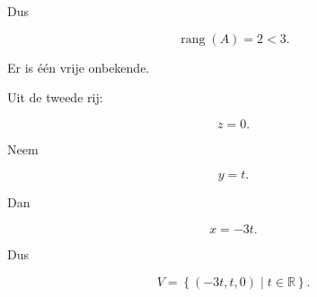 \documentclass{ximera}
\begin{document}
\begin{oefening}{\oefB\ESS}
\begin{question}
\begin{oplossing}
Dus

\[
\operatorname{rang}(A)=2<3.
\]

Er is één vrije onbekende.

Uit de tweede rij:

\[
z=0.
\]

Neem

\[
y=t.
\]

Dan

\[
x=-3t.
\]

Dus

\[
V=
\left\{
(-3t,t,0)
\mid t\in\mathbb{R}
\right\}.
\]

\end{oplossing}

\end{question}

\end{oefening}






\end{document}
